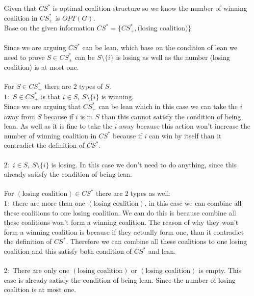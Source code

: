 \documentclass{article}
\begin{document}
Given that $CS^*$ is optimal coalition structure so we know the number of winning coalition in $CS^*_+$ is $OPT(G)$.\\
Base on the given information $CS^* = \{CS^*_+,\text{(losing coalition)}\}$\\\\
Since we are arguing $CS^*$ can be lean, which base on the condition of lean we need to prove $S \in CS^*_+$ can be $ S\setminus \{i\}$ is losing as well as the number (losing coalition) is at most one.\\\\
For $S \in CS^*_+$ there are $2$ types of $S$.\\
$1:$ $S \in CS^*_+$ is that $i \in S,\ S \setminus \{i\}$ is winning. \\
Since we are arguing that $CS^*_+$ can be lean which in this case we can take the $i$ away from $S$ because if $i$ is in $S$ than this cannot satisfy the condition of being lean. As well as it is fine to take the $i$ away because this action won't increase the number of winning coalition in $CS^*$ because if $i$ can win by itself than it contradict the definition of $CS^*$.\\\\
$2:$ $i \in S,\ S\setminus \{i\}$ is losing. In this case we don't need to do anything, since this already satisfy the condition of being lean. \\\\
For $(\text{losing coalition}) \in CS^*$ there are $2$ types as well:\\
$1:$ there are more than one $(\text{losing coalition})$, in this case we can combine all these coalitions to one losing coalition. We can do this is because combine all these coalitions won't form a winning coalition. The reason of why they won't form a winning coalition is because if they actually form one, than it contradict the definition of $CS^*$. Therefore we can combine all these coalitions to one losing coalition and this satisfy both condition of $CS^*$ and lean.\\\\
$2: $ There are only one $(\text{losing coalition})$ or $(\text{losing coalition})$ is empty. This case is already satisfy the condition of being lean. Since the number of losing coalition is at most one.\\\\

 
\newpage
\end{document}
